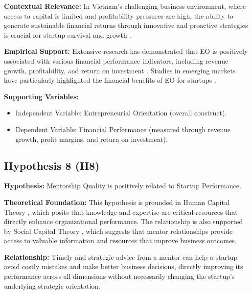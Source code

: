 \documentclass[../Main.tex]{subfiles}
\begin{document}
    \textbf{Contextual Relevance:} In Vietnam's challenging business environment, where access to capital is limited and profitability pressures are high, the ability to generate sustainable financial returns through innovative and proactive strategies is crucial for startup survival and growth \cite{vietnam_innovation_report_2024}.
    
    \textbf{Empirical Support:} Extensive research has demonstrated that EO is positively associated with various financial performance indicators, including revenue growth, profitability, and return on investment \cite{rauch2009entrepreneurial, saeed2014entrepreneurial}. Studies in emerging markets have particularly highlighted the financial benefits of EO for startups \cite{wales2013entrepreneurial}.
    
    \textbf{Supporting Variables:}
    \begin{itemize}
        \item Independent Variable: Entrepreneurial Orientation (overall construct).
        \item Dependent Variable: Financial Performance (measured through revenue growth, profit margins, and return on investment).
    \end{itemize}

    \subsection{Hypothesis 8 (H8)}
    \textbf{Hypothesis:} Mentorship Quality is positively related to Startup Performance.
    
    \textbf{Theoretical Foundation:} This hypothesis is grounded in Human Capital Theory \cite{becker1964human}, which posits that knowledge and expertise are critical resources that directly enhance organizational performance. The relationship is also supported by Social Capital Theory \cite{coleman1988social}, which suggests that mentor relationships provide access to valuable information and resources that improve business outcomes.
    
    \textbf{Relationship:} Timely and strategic advice from a mentor can help a startup avoid costly mistakes and make better business decisions, directly improving its performance across all dimensions without necessarily changing the startup's underlying strategic orientation.
    
\end{document}
